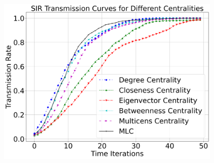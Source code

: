 \documentclass[10pt,letterpaper]{article}
\begin{document}
\begin{figure}[h!]
\begin{minipage}[b]{0.25\linewidth}
	\includegraphics[width=\textwidth]{figs/fig22-npas1_arnt-k2top2.png}
	\subcaption{}
\end{minipage}

\vspace{0.5cm}


\end{figure}
\end{document}
